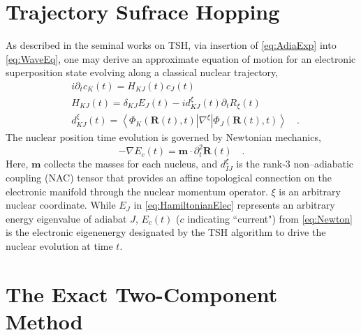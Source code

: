 \documentclass[12pt]{article}
\newcommand{\innerop}[3]{\left\langle #1 \left\vert #2 \right\vert #3 \right\rangle}  %
\newcommand*\vc[1]{\boldsymbol{#1}}
\begin{document}
\section{Trajectory Sufrace Hopping}
\label{sec:TSH}

As described in the seminal works on TSH\cite{Tully98_407, Tully90_1061}, via
insertion of \cref{eq:AdiaExp} into \cref{eq:WaveEq}, one may derive an
approximate equation of motion for an electronic superposition state evolving
along a classical nuclear trajectory,
\begin{align}
  &i  \partial_t c_K(t) = H_{KJ}(t) c_J(t) \label{eq:EOMCs} \\
  &H_{KJ}(t) = \delta_{KJ}E_J(t) - i d_{KJ}^\xi (t) \partial_t R_{\xi}(t) \label{eq:HamiltonianElec} \\
  &d_{KJ}^\xi (t) = \innerop{\Phi_K(\vc{R}(t),t)}{\nabla^\xi}{\Phi_J(\vc{R}(t),t)} \label{eq:NAC}
  \quad .
\end{align}
The nuclear position time evolution is governed by Newtonian mechanics,
\begin{equation}
  -\nabla E_c(t) = \vc{m}\cdot \partial_t^2\vc{R}(t) \label{eq:Newton}
  \quad.
\end{equation}
Here, $\vc{m}$ collects the masses for each nucleus, and $d_{IJ}^\xi$ is the
rank-3 non--adiabatic coupling (NAC) tensor that provides an affine topological
connection on the electronic manifold through the nuclear momentum operator.
$\xi$ is an arbitrary nuclear coordinate.  While $E_J$ in
\cref{eq:HamiltonianElec} represents an arbitrary energy eigenvalue of adiabat
$J$, $E_c(t)$ ($c$ indicating ``current") from \cref{eq:Newton} is the
electronic eigenenergy designated by the TSH algorithm to drive the nuclear
evolution at time $t$.  



\section{The Exact Two-Component Method}
\label{sec:X2C}
\end{document}
